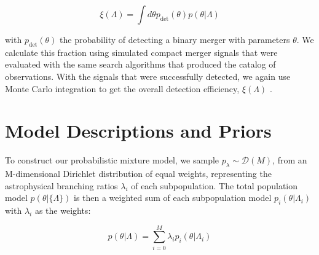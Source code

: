 \begin{equation} \label{eq:detfrac}
    \xi(\Lambda) = \int d\theta p_\mathrm{det}(\theta) p(\theta | \Lambda)
\end{equation}

\noindent with $p_\mathrm{det}(\theta)$ the probability of detecting a binary merger with parameters $\theta$. We calculate this fraction using simulated compact merger signals that were evaluated with the same search algorithms that produced the catalog of observations. With the signals that were successfully detected, we again use Monte Carlo integration to get the overall detection efficiency, $\xi(\Lambda)$ \citep{1712.00482, 1904.10879, 2204.00461}.


\section{Model Descriptions and Priors} \label{sec:model-descrip}


To construct our probabilistic mixture model, we sample $p_{\lambda} \sim \mathcal{D}(M)$, from an M-dimensional Dirichlet distribution of equal weights, representing the astrophysical branching ratios $\lambda_{i}$ of each subpopulation. The total population model $p(\theta | \{\Lambda\})$ is then a weighted sum of each subpopulation model $p_i(\theta|\Lambda_i)$ with $\lambda_i$ as the weights:

\begin{equation} \label{totmixmod}
p(\theta|\Lambda) = \sum_{i=0}^{M} \lambda_i p_i(\theta | \Lambda_i)
\end{equation}





